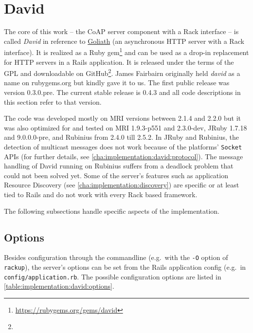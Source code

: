 \section{David}
\label{cha:implementation:david}

	The core of this work -- the CoAP server component with a Rack interface --
	is called \emph{David} in reference to
	\href{http://postrank-labs.github.io/goliath}{Goliath} (an asynchronous
	\ac{HTTP} server with a Rack interface). It is realized as a Ruby
	gem\footnote{\url{https://rubygems.org/gems/david}} and can be used as a
	drop-in replacement for \ac{HTTP} servers in a \ac{Rails} application. It
	is released under the terms of the \ac{GPL} \cite{gplv3} and downloadable
	on GitHub\footnote{\urlDavid}. James Fairbairn originally held \emph{david}
	as a name on rubygems.org but kindly gave it to us. The first public
	release was version 0.3.0.pre. The current stable release is 0.4.3 and all
	code descriptions in this section refer to that version.

	The code was developed mostly on \ac{MRI} versions between 2.1.4 and 2.2.0
	but it was also optimized for and tested on \ac{MRI} 1.9.3-p551 and
	2.3.0-dev, JRuby 1.7.18 and 9.0.0.0-pre, and Rubinius from 2.4.0 till
	2.5.2. In JRuby and Rubinius, the detection of multicast messages does not
	work because of the platforms' \texttt{Socket} \acp{API} (for further
	details, see \autoref{cha:implementation:david:protocol}). The message
	handling of David running on Rubinius suffers from a deadlock problem that
	could not been solved yet. Some of the server's features such as
	application Resource Discovery (see \autoref{cha:implementation:discovery})
	are specific or at least tied to Rails and do not work with every Rack
	based framework.
	
	The following subsections handle specific aspects of the implementation.

	\subsection{Options}

		Besides configuration through the commandline (e.g.\ with the
		\texttt{-O} option of \texttt{rackup}), the server's options can be set
		from the Rails application config (e.g.\ in
		\texttt{config/application.rb}. The possible configuration options are
		listed in \autoref{table:implementation:david:options}.

